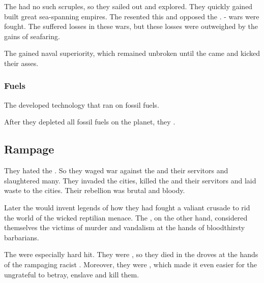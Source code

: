 The \aryothim{} had no such scruples, so they sailed out and explored. 
They quickly gained built great sea-spanning empires. 
The \nagae{} resented this and opposed the \aryothim. 
\Naga-\aryoth{} wars were fought. 
The \aryothim{} suffered losses in these wars, but these losses were outweighed by the gains of seafaring. 

The \aryothim{} gained naval superiority, which remained unbroken until the \dragons came and kicked their asses. 





\subsubsection{Fuels}
The \aryothim developed technology that ran on fossil fuels. 

After they depleted all fossil fuels on the planet, they . 








\subsection{Rampage}
They hated the . 
So they waged war against the \quiljaaran{} and their servitors and slaughtered many. 
They invaded the \quiljaaran{} cities, killed the \quiljaaran{} and their servitors and laid waste to the cities. 
Their rebellion was brutal and bloody.



Later the \aryothim{} would invent legends of how they had fought a valiant crusade to rid the world of the wicked reptilian menace. 
The \quiljaaran, on the other hand, considered themselves the victims of murder and vandalism at the hands of bloodthirsty barbarians. 

The \loculs{} were especially hard hit. 
They were , so they died in the droves at the hands of the rampaging racist \nephilim. 
Moreover, they were , which made it even easier for the ungrateful \nephilim{} to betray, enslave and kill them. 

